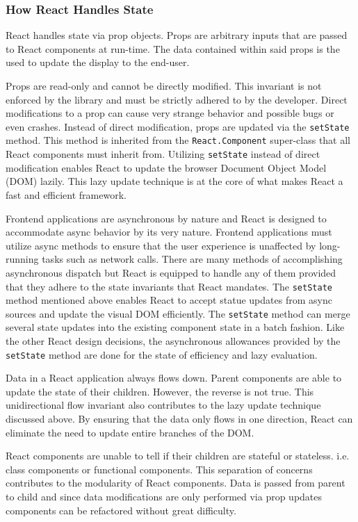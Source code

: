 \documentclass[12pt]{report}
\begin{document}
\subsubsection*{How React Handles State}

React handles state via prop objects. Props are arbitrary inputs that are passed to React components at run-time. The data contained within said props is the used to update the display to the end-user.

Props are read-only and cannot be directly modified. This invariant is not enforced by the library and must be strictly adhered to by the developer. Direct modifications to a prop can cause very strange behavior and possible bugs or even crashes. Instead of direct modification, props are updated via the \texttt{setState} method. This method is inherited from the \texttt{React.Component} super-class that all React components must inherit from. Utilizing \texttt{setState} instead of direct modification enables React to update the browser Document Object Model (DOM) lazily. This lazy update technique is at the core of what makes React a fast and efficient framework.

Frontend applications are asynchronous by nature and React is designed to accommodate async behavior by its very nature. Frontend applications must utilize async methods to ensure that the user experience is unaffected by long-running tasks such as network calls. There are many methods of accomplishing asynchronous dispatch but React is equipped to handle any of them provided that they adhere to the state invariants that React mandates. The \texttt{setState} method mentioned above enables React to accept statue updates from async sources and update the visual DOM efficiently. The \texttt{setState} method can merge several state updates into the existing component state in a batch fashion. Like the other React design decisions, the asynchronous allowances provided by the \texttt{setState} method are done for the state of efficiency and lazy evaluation.

Data in a React application always flows down. Parent components are able to update the state of their children. However, the reverse is not true. This unidirectional flow invariant also contributes to the lazy update technique discussed above. By ensuring that the data only flows in one direction, React can eliminate the need to update entire branches of the DOM.

React components are unable to tell if their children are stateful or stateless. i.e. class components or functional components. This separation of concerns contributes to the modularity of React components. Data is passed from parent to child and since data modifications are only performed via prop updates components can be refactored without great difficulty.
\end{document}
